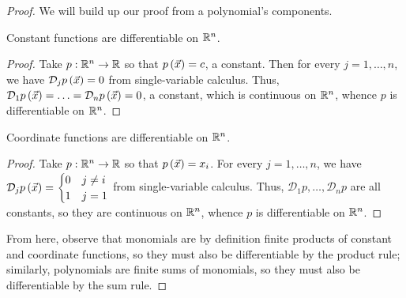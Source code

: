 \documentclass[main.tex]{subfiles}
\begin{document}
\begin{proof}
    We will build up our proof from a polynomial's components.
    \begin{claim}
        Constant functions are differentiable on $\mathbb R^n$.
    \end{claim}
    \begin{proof}
        Take $p : \mathbb R^n \to \mathbb R$ so that $p\left( \vec{x} \right) = c$, a constant. Then for every $j = 1, \ldots , n$, we have $\mathcal{D}_jp\left( \vec{x} \right) = 0$ from single-variable calculus. Thus, $\mathcal{D}_1p\left( \vec{x} \right) = \ldots = \mathcal{D}_np\left( \vec{x} \right) = 0$, a constant, which is continuous on $\mathbb R^n$, whence $p$ is differentiable on $\mathbb R^n$.
    \end{proof}
    \begin{claim}
        Coordinate functions are differentiable on $\mathbb R^n$.
    \end{claim}
    \begin{proof}
        Take $p : \mathbb R^n \to \mathbb R$ so that $p\left( \vec{x} \right) = x_i$. For every $j = 1, \ldots , n$, we have $\mathcal{D}_jp\left( \vec{x} \right) = \begin{cases}
            0 & j \neq i \\
            1 & j = 1
        \end{cases}$ from single-variable calculus. Thus, $\mathcal{D}_1p, \ldots , \mathcal{D}_np$ are all constants, so they are continuous on $\mathbb R^n$, whence $p$ is differentiable on $\mathbb R^n$.
    \end{proof}
    From here, observe that monomials are by definition finite products of constant and coordinate functions, so they must also be differentiable by the product rule; similarly, polynomials are finite sums of monomials, so they must also be differentiable by the sum rule.
\end{proof}
\end{document}
